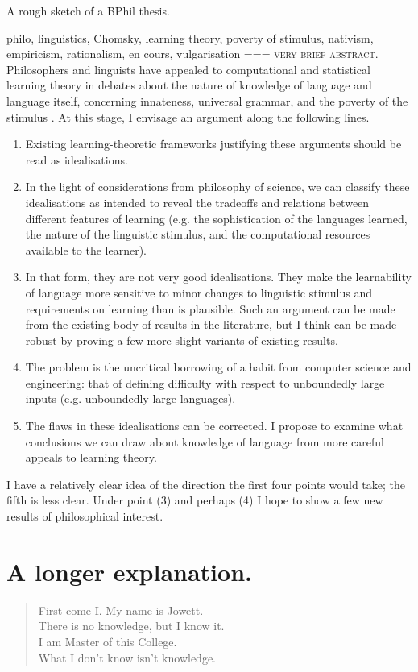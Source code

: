 A rough sketch of a BPhil thesis.

philo, linguistics, Chomsky, learning theory, poverty of stimulus, nativism, empiricism, rationalism, en cours, vulgarisation
===
\textsc{very brief abstract.} Philosophers and linguists have appealed to computational and statistical learning theory in debates about the nature of knowledge of language and language itself, concerning innateness, universal grammar, and the poverty of the stimulus \parencite{nowak2001,clark2010, clark2011, clark2012, clark2013}. At this stage, I envisage an argument along the following lines.
\begin{enumerate}
\item Existing learning-theoretic frameworks justifying these arguments should be read as idealisations.
\item In the light of considerations from philosophy of science, we can classify these idealisations as intended to reveal the tradeoffs and relations between different features of learning (e.g. the sophistication of the languages learned, the nature of the linguistic stimulus, and the computational resources available to the learner).
\item In that form, they are not very good idealisations. They make the learnability of language more sensitive to minor changes to linguistic stimulus and requirements on learning than is plausible. Such an argument can be made from the existing body of results in the literature, but I think can be made robust by proving a few more slight variants of existing results.
\item The problem is the uncritical borrowing of a habit from computer science and engineering: that of defining difficulty with respect to unboundedly large inputs (e.g. unboundedly large languages). 
\item The flaws in these idealisations can be corrected. I propose to examine what conclusions we can draw about knowledge of language from more careful appeals to learning theory.
\end{enumerate}
I have a relatively clear idea of the direction the first four points would take; the fifth is less clear. Under point (3) and perhaps (4) I hope to show a few new results of philosophical interest.
\section*{A longer explanation.}
\begin{quote}
First come I. My name is Jowett.\\
There is no knowledge, but I know it.\\
I am Master of this College.\\
What I don't know isn't knowledge.
\end{quote}


